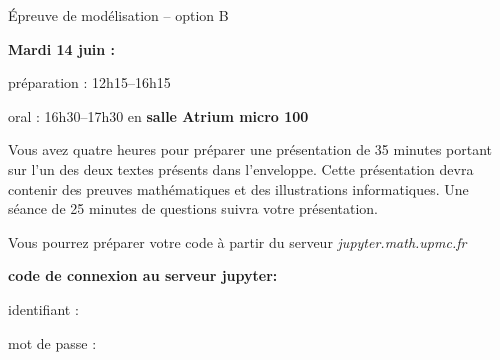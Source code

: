 \documentclass{article}
\begin{document}
\begin{center}
  {\Large \'Epreuve de mod\'elisation -- option B}
\end{center}

\vspace{4cm}

\noindent
\textbf{Mardi 14 juin :}

\vspace{1cm}

\noindent
pr\'eparation : 12h15--16h15

\vspace{1cm}

\noindent
oral : 16h30--17h30 en \textbf{salle Atrium micro 100}

\vspace{2cm}

\noindent
Vous avez quatre heures pour pr\'eparer une pr\'esentation de 35 minutes
portant sur l'un des deux textes pr\'esents dans l'enveloppe.
Cette pr\'esentation devra contenir des preuves math\'ematiques et des illustrations informatiques.
Une s\'eance de 25 minutes de questions suivra votre pr\'esentation.

\vspace{2cm}
\noindent
Vous pourrez pr\'eparer votre code \`a partir du serveur
\textit{jupyter.math.upmc.fr}

\vspace{2cm}
\noindent
\textbf{code de connexion au serveur jupyter:}

\noindent
identifiant : 

\noindent
mot de passe : 
\end{document}
